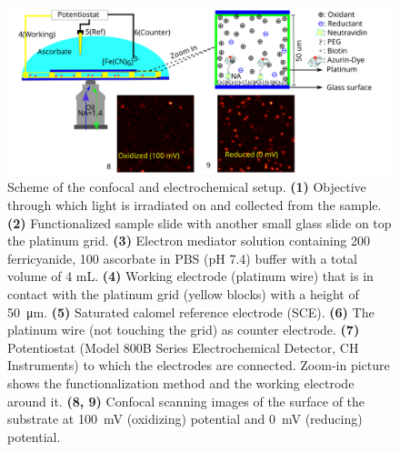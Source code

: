 \begin{figure}
	\centering
	\includegraphics[width=\textwidth]{Scheme_1_setup}
	\caption{Scheme of the confocal and electrochemical setup.
	\textbf{(1)} Objective through which light is irradiated on and collected from the sample.
	\textbf{(2)} Functionalized sample slide with another small glass slide on top the platinum grid.
	\textbf{(3)} Electron mediator solution containing \SI{200}{\uM} ferricyanide, \SI{100}{\uM} ascorbate in PBS (pH 7.4) buffer with a total volume of 4 mL.
	\textbf{(4)} Working electrode (platinum wire) that is in contact with the platinum grid (yellow blocks) with a height of \SI{50}{\um}.
	\textbf{(5)} Saturated calomel reference electrode (SCE).
	\textbf{(6)} The platinum wire (not touching the grid) as counter electrode.
	\textbf{(7)} Potentiostat (Model 800B Series Electrochemical Detector, CH Instruments) to which the electrodes are connected.
	Zoom-in picture shows the functionalization method and the working electrode around it. 
	\textbf{(8, 9)} Confocal scanning images of the surface of the substrate at \SI{100}{\mV} (oxidizing) potential and \SI{0}{\mV} (reducing) potential.
	}
  	\label{sch:setup}
\end{figure}

